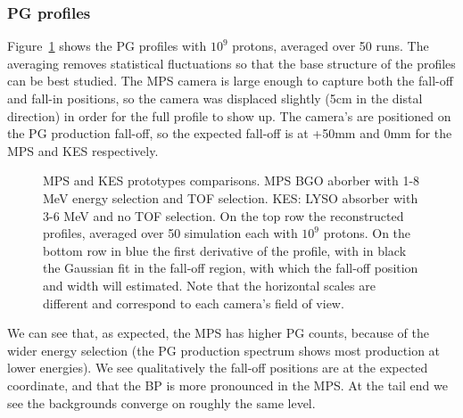 \documentclass[a4paper,english,12pt]{article}
\begin{document}
\subsubsection{PG profiles}

Figure~\ref{fig:PGprofileProtoComp} shows the PG profiles with $10^9$ protons, averaged over 50 runs. The averaging removes statistical fluctuations so that the base structure of the profiles can be best studied. The MPS camera is large enough to capture both the fall-off and fall-in positions, so the camera was displaced slightly (5cm in the distal direction) in order for the full profile to show up. The camera's are positioned on the PG production fall-off, so the expected fall-off is at +50mm and 0mm for the MPS and KES respectively.

\begin{figure}[!htp]
  \centering
  \quad
  \caption{\label{fig:PGprofileProtoComp}MPS and KES prototypes comparisons. MPS BGO aborber with 1-8 MeV energy selection and TOF selection. KES: LYSO absorber with 3-6 MeV and no TOF selection. On the top row the reconstructed profiles, averaged over 50 simulation each with $10^9$ protons. On the bottom row in blue the first derivative of the profile, with in black the Gaussian fit in the fall-off region, with which the fall-off position and width will estimated. Note that the horizontal scales are different and correspond to each camera's field of view.}
\end{figure}  

We can see that, as expected, the MPS has higher PG counts, because of the wider energy selection (the PG production spectrum shows most production at lower energies). We see qualitatively the fall-off positions are at the expected coordinate, and that the BP is more pronounced in the MPS. At the tail end we see the backgrounds converge on roughly the same level. 
\end{document}
